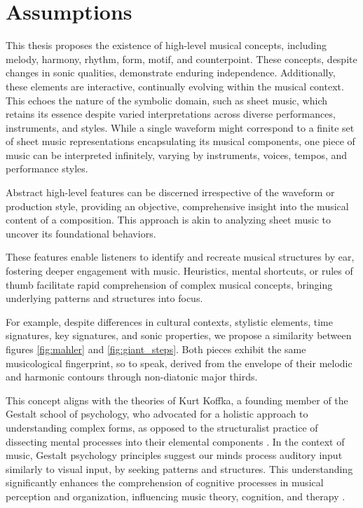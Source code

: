 \section{Assumptions}

This thesis proposes the existence of high-level musical concepts, including melody, harmony, rhythm, form, motif, and counterpoint. These concepts, despite changes in sonic qualities, demonstrate enduring independence. Additionally, these elements are interactive, continually evolving within the musical context. This echoes the nature of the symbolic domain, such as sheet music, which retains its essence despite varied interpretations across diverse performances, instruments, and styles. While a single waveform might correspond to a finite set of sheet music representations encapsulating its musical components, one piece of music can be interpreted infinitely, varying by instruments, voices, tempos, and performance styles.

Abstract high-level features can be discerned irrespective of the waveform or production style, providing an objective, comprehensive insight into the musical content of a composition. This approach is akin to analyzing sheet music to uncover its foundational behaviors.

These features enable listeners to identify and recreate musical structures by ear, fostering deeper engagement with music. Heuristics, mental shortcuts, or rules of thumb facilitate rapid comprehension of complex musical concepts, bringing underlying patterns and structures into focus.

For example, despite differences in cultural contexts, stylistic elements, time signatures, key signatures, and sonic properties, we propose a similarity between figures \ref{fig:mahler} and \ref{fig:giant_steps}. Both pieces exhibit the same musicological fingerprint, so to speak, derived from the envelope of their melodic and harmonic contours through non-diatonic major thirds.

This concept aligns with the theories of Kurt Koffka, a founding member of the Gestalt school of psychology, who advocated for a holistic approach to understanding complex forms, as opposed to the structuralist practice of dissecting mental processes into their elemental components \cite{Koffka2013PrinciplesPsychology}. In the context of music, Gestalt psychology principles suggest our minds process auditory input similarly to visual input, by seeking patterns and structures. This understanding significantly enhances the comprehension of cognitive processes in musical perception and organization, influencing music theory, cognition, and therapy \cite{Lerdahl1985AMusic}.

